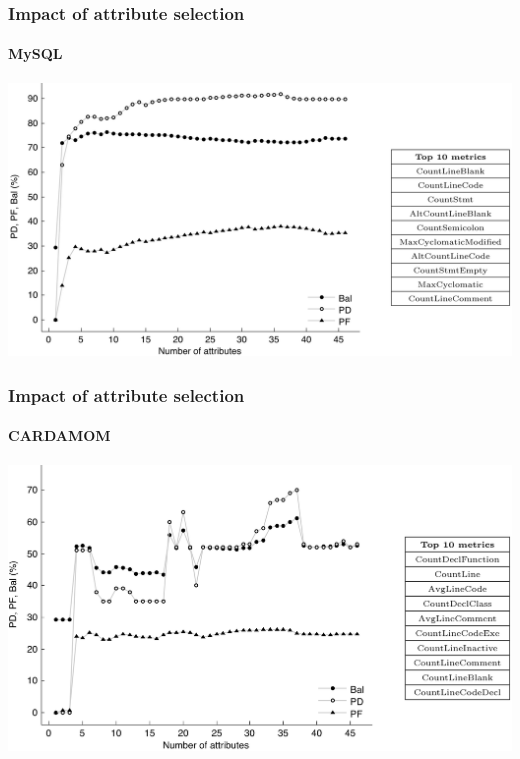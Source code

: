 \begin{frame}
 \frametitle{Impact of attribute selection}
 \framesubtitle{MySQL}
 \begin{center}
  \includegraphics[width=\textwidth]{figures/attributesMysql.png}
 \end{center}
\end{frame}

\begin{frame}
 \frametitle{Impact of attribute selection}
 \framesubtitle{CARDAMOM}
 \begin{center}
  \includegraphics[width=\textwidth]{figures/attributesCardamom.png}
 \end{center}
\end{frame}

